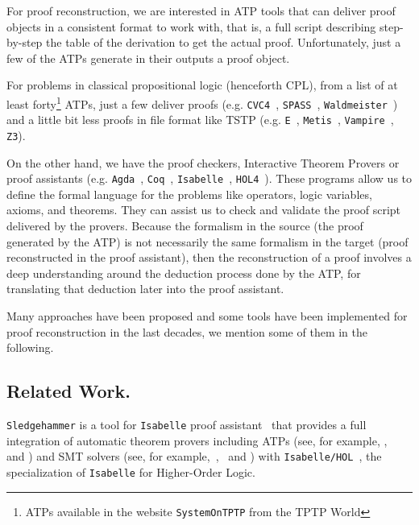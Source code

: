\documentclass[runningheads,a4paper]{llncs}
\begin{document}
For proof reconstruction, we are interested in ATP tools that can deliver proof
objects in a consistent format to work with, that is, a full script describing
step-by-step the table of the derivation to get the actual proof. Unfortunately,
just a few of the ATPs generate in their outputs a proof object.


For problems in classical propositional logic (henceforth CPL), from a list of
at least forty\footnote{ATPs available in the website  \texttt{SystemOnTPTP}
  from the TPTP World} ATPs, just a few deliver proofs (e.g.
\verb!CVC4!~\cite{Barrett2011}, \verb!SPASS!~\cite{Weidenbach2009},
\verb!Waldmeister!~\cite{hillenbrand1997}) and a little bit less proofs in file
format like TSTP (e.g. \verb!E!~\cite{Schulz:AICOM-2002}, \verb!Metis!~\cite{hurd2003first}, \verb!Vampire!~\cite{Riazanov1999}, \verb!Z3!).

On the other hand, we have the proof checkers, Interactive Theorem Provers
or proof assistants (e.g. \verb!Agda!~\cite{agdateam}, \verb!Coq!~\cite{coqteam}, \verb!Isabelle!~\cite{paulson1994isabelle}, \verb!HOL4!~\cite{norrish2007hol}). These programs allow us to define the formal language for the problems like operators, logic variables, axioms, and theorems. They can assist us to check and validate the proof script delivered by the provers. Because the formalism in the source (the proof generated by the ATP) is not necessarily the same formalism in the target (proof reconstructed in the proof assistant), then the reconstruction of a proof involves a deep understanding around the deduction process done by the ATP, for translating that deduction later into the proof assistant.

Many approaches have been proposed and some tools have been implemented for proof reconstruction in the last decades, we mention some of them in the following.

\subsection*{Related Work.}\label{Related Work}
\par
\verb!Sledgehammer! is a tool for \verb!Isabelle! proof
assistant~\cite{paulson1994isabelle} that provides a full integration of
automatic theorem provers including ATPs (see, for example,
\cite{meng2006automation}, ~\cite{blanchette2013extending} and \cite{Fleury2014}) and SMT solvers (see, for
example,~\cite{blanchette2013extending},~\cite{bohme2010} and \cite{Fleury2014}) with \verb!Isabelle/HOL!~\cite{nipkow2002isabelle}, the specialization of \verb!Isabelle! for Higher-Order Logic.
\end{document}
